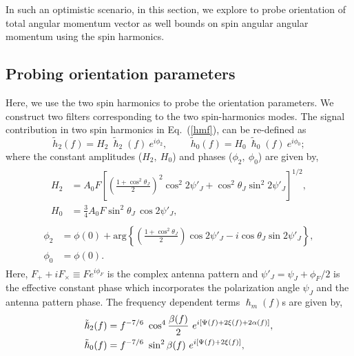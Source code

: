 \documentclass[preprint,onecolumn,,tightenlines,superscriptaddress,showpacs,nofootinbib,eqsecnum,amsfonts,amsmath]{revtex4}
\begin{document}
In such an optimistic scenario, in this section, we explore to probe orientation of total angular momentum vector as well bounds on spin angular angular momentum using the spin harmonics.

\subsection{Probing orientation parameters}

Here, we use the two spin harmonics to probe the orientation parameters. We construct two filters corresponding 
to the two spin-harmonics modes. The signal contribution in two spin harmonics in Eq.~(\ref{hmf}), can be re-defined as 
\begin{equation}
\tilde{h}_{2}(f) =  H_{2}~\tilde \hslash_{2}(f)~e^{i\phi_{2}}, \hspace{1cm} \tilde{h}_{0}(f) = H_{0}~\tilde \hslash_{0}(f)~e^{i\phi_{0}}; 
\label{signal_split}
\end{equation}
where the constant amplitudes ($H_2, ~H_0$) and phases ($\phi_2, ~\phi_0$) are given by,
\begin{align}
\begin{split}
H_{2} &=  A_{0} F \left[\left(\frac{1+\cos^2 \theta_J}{2}\right)^2   \cos^2 2 \psi'_J  + \cos^2\theta_J \sin^2 2 \psi'_J \right]^{1/2}, \\
H_{0}  &=  \frac{3}{4}A_{0} F\sin^2 \theta_J\,\cos 2\psi'_J,
\label{H}
\end{split}
\end{align}
\begin{align}
\begin{split}
\phi_{2} &=  \phi(0)+ \text{arg}\left \{\left(\frac{1+\cos^2 \theta_J}{2}\right)   \cos2 \psi'_J - i \cos\theta_J \sin2 \psi'_J \right\}, \\
\phi_{0} &=   \phi(0).
\label{phi}
\end{split}
\end{align}
Here, $F_+ + i F_\times \equiv F e^{i \phi_F}$ is the complex antenna pattern and  $ \psi'_J =  \psi_J +\phi_F/2$ 
is the effective constant phase which incorporates the polarization angle $\psi_J$ and the antenna pattern phase. 
The frequency dependent terms $\hslash_{m}(f)$s are given by,
\begin{align}
\begin{split}
\tilde \hslash_{2}(f) &=  f^{-7/6}~\cos^4 \frac{\beta(f)}{2}~ e^{i\small[\Psi(f)+2\xi(f)+2\alpha(f)\small]}, \\
\tilde \hslash_{0}(f)  &=  f^{-7/6}~\sin^2 \beta(f) ~e^{i\small[\Psi(f)+2\xi(f)\small]},
\label{hslash}
\end{split}
\end{align}
\end{document}
